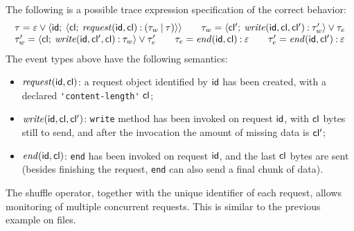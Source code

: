
The following is a possible trace expression specification of the correct behavior:
$$
\begin{array}{l}
\tau = \varepsilon \mathbin{\vee} {\langle}\mathsf{id};\:{{\langle}\mathsf{cl};\:{ \mathit{request}(\mathsf{id}, \mathsf{cl}) \mathbin{:} (\tau_w\mathbin{|}\tau)}{\rangle}}{\rangle}\qquad
\tau_w = {\langle}\mathsf{cl'};\:{\mathit{write}(\mathsf{id}, \mathsf{cl}, \mathsf{cl'})\mathbin{:}\tau_w'}{\rangle} \mathbin{\vee} \tau_e\\
\tau_w' = {\langle}\mathsf{cl};\:{\mathit{write}(\mathsf{id}, \mathsf{cl'}, \mathsf{cl})\mathbin{:} \tau_w}{\rangle} \mathbin{\vee} \tau_e'\qquad
\tau_e = \mathit{end}(\mathsf{id}, \mathsf{cl})\mathbin{:} \varepsilon\qquad
\tau_e' = \mathit{end}(\mathsf{id}, \mathsf{cl'})\mathbin{:}\varepsilon
\end{array}
$$
The event types above have the following semantics:
\begin{itemize}
\item  \(\mathit{request}(\mathsf{id}, \mathsf{cl})\): a request object identified by \(\mathsf{id}\) has been created, with a declared \lstinline{'content-length'} \(\mathsf{cl}\);
\item \(\mathit{write}(\mathsf{id}, \mathsf{cl}, \mathsf{cl'})\): \lstinline{write} method has been invoked on request \(\mathsf{id}\), with \(\mathsf{cl}\) bytes still to send, and after the invocation the amount of missing data is \(\mathsf{cl'}\);
\item \(\mathit{end}(\mathsf{id}, \mathsf{cl})\): \lstinline{end} has been invoked on request \(\mathsf{id}\), and the last \(\mathsf{cl}\) bytes are sent (besides finishing the request, \lstinline{end} can also send a final chunk of data).
\end{itemize}

The shuffle operator, together with the unique identifier of each request, allows monitoring of multiple concurrent requests.
This is similar to the previous example on files.

